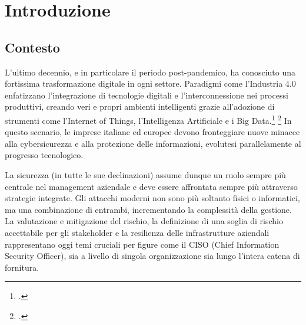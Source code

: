 \chapter{Introduzione}



\section{Contesto}
L'ultimo decennio, e in particolare il periodo post-pandemico, ha conosciuto una fortissima trasformazione
digitale in ogni settore. Paradigmi come l'Industria 4.0 enfatizzano l'integrazione di tecnologie digitali e 
l’interconnessione nei processi produttivi, creando veri e propri ambienti intelligenti grazie all’adozione di 
strumenti come l’Internet of Things, l’Intelligenza Artificiale e i Big Data.\footcite[pp. 1--2]{clusit-report}
\footcite[pp. 3--4]{enisa-threat-landscape} In questo scenario, le imprese italiane ed europee devono fronteggiare 
nuove minacce alla cybersicurezza e alla protezione delle informazioni,
evolutesi parallelamente al progresso tecnologico.

La sicurezza (in tutte le sue declinazioni) assume dunque un ruolo sempre più centrale nel management aziendale
e deve essere affrontata sempre più attraverso strategie integrate.
Gli attacchi moderni non sono più soltanto fisici o informatici, ma una combinazione di entrambi,
incrementando la complessità della gestione. La valutazione e mitigazione del rischio, la definizione di una soglia 
di rischio accettabile per gli stakeholder e la resilienza delle infrastrutture aziendali rappresentano oggi temi 
cruciali per figure come il CISO (Chief Information Security Officer),
sia a livello di singola organizzazione sia lungo l’intera catena di fornitura.



